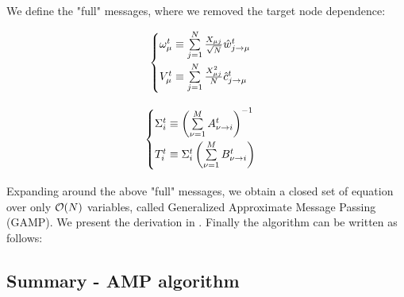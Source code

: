 \documentclass[aip,jmp,amsmath,amssymb,reprint]{revtex4}
\begin{document}
We define the "full" messages, where we removed the target node dependence:\\
\begin{minipage}[c]{.46\linewidth}
\begin{equation*}
	\begin{cases}
		\omega_{\mu}^t \equiv \sum\limits_{j = 1}^N \frac{X_{\mu j}}{\sqrt{N}}   \hat{w}_{j\to \mu}^t\vspace{0.1cm} \\
		V_{\mu}^t \equiv  \sum\limits_{j=1}^N \frac{X_{\mu j}^2}{N}   \hat{c}_{j\to \mu}^t\vspace{0.1cm} \\
	\end{cases}
\end{equation*}
\end{minipage} \hfill
\begin{minipage}[c]{.46\linewidth}
\begin{equation}
	\begin{cases}
		\Sigma_{i  }^t \equiv  \left( \sum\limits_{\nu =1}^M  A_{\nu \to i}^t \right )^{-1} \vspace{0.1cm} \\
	T_{i }^t \equiv  \Sigma_{i}^t  \left( \sum\limits_{\nu =1}^M  B_{\nu \to i}^t \right)\vspace{0.1cm} \\
	\end{cases}
\end{equation}
\end{minipage}

Expanding \Eq{\ref{supp:relaxed_BP}} around the above "full" messages, we obtain a closed set of equation over only $\mathcal{O}(N)$ variables, called Generalized Approximate Message Passing (GAMP). We present the derivation in \Eq{\ref{appendix:towardsAMP}}. Finally the algorithm can be written as follows:

\subsection*{Summary - AMP algorithm}
\end{document}
